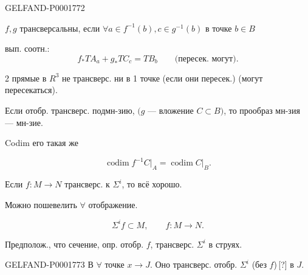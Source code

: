 


\begin{GelfandAdjacentEvidence}{GELFAND-P000177}{2}
\end{GelfandAdjacentEvidence}

$f,g$ трансверсальны, если $\forall a\in f^{-1}(b),c\in g^{-1}(b)$ в точке $b\in B$

вып. соотн.:
\begin{equation*}f_*TA_a+g_*TC_c=TB_b\qquad\text{(пересек. могут).}\end{equation*}

2 прямые в $R^3$ не трансверс. ни в 1 точке (если они пересек.) (могут пересекаться).

Если отобр. трансверс. подмн-зию, $(g$ — вложение $C\subset B)$, то прообраз мн-зия — мн-зие.

Codim его такая же

\begin{equation*}\operatorname{codim}f^{-1}C\big|_A=\operatorname{codim}C\big|_B.\end{equation*}

Если $f:M\longrightarrow N$ трансверс. к $\Sigma^i$, то всё хорошо.

Можно пошевелить $\forall$ отображение.


\begin{equation*}\Sigma^i f\subset M,\qquad f:M\longrightarrow N.\end{equation*}

Предполож., что сечение, опр. отобр. $f$, трансверс. $\Sigma^i$ в струях.

\begin{GelfandAdjacentEvidence}{GELFAND-P000177}{3}
В $\forall$ точке $x\longrightarrow J$. Оно трансверс. отобр. $\Sigma^i$ (без $f$)\,[?] в $J$.
\end{GelfandAdjacentEvidence}

